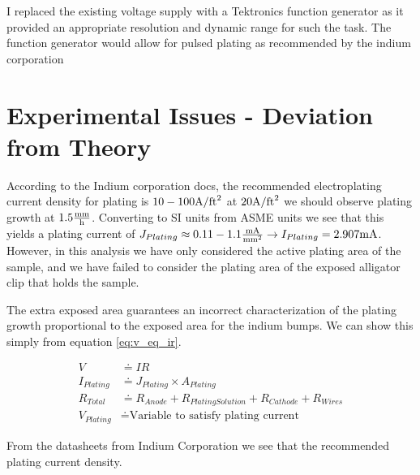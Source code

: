 I replaced the existing voltage supply with a Tektronics function generator as it provided an appropriate resolution and dynamic range for such the task.
The function generator would allow for pulsed plating as recommended by the indium corporation \cite{indiumCorpGrainStructure}

\newpage
\section{Experimental Issues - Deviation from Theory}

According to the Indium corporation docs, the recommended electroplating current density for plating is $10-100 \jufeet$ at $20 \jufeet$ we should observe plating growth at $1.5 \mmph$.
Converting to SI units from ASME units we see that this yields a plating current of $ J_{Plating} \approx 0.11-1.1 \junits \rightarrow I_{Plating} = 2.907 \mA$. However, in this analysis we have only considered the active plating area of the sample, and we have failed to consider the plating area of the exposed alligator clip that holds the sample.

The extra exposed area guarantees an incorrect characterization of the plating growth proportional to the exposed area for the indium bumps. We can show this simply from equation \ref{eq:v_eq_ir}.

\begin{equation}
    \begin{split}
        V &\doteq I R \\
        I_{Plating} &\doteq J_{Plating} \times A_{Plating} \\
        R_{Total} &\doteq R_{Anode} + R_{Plating Solution} + R_{Cathode} + R_{Wires} \\
        V_{Plating} &\doteq \text{Variable to satisfy plating current}
    \end{split}
    \label{eq:v_eq_ir}
\end{equation}

From the datasheets from Indium Corporation \cite{indiumCorpPlating} we see that the recommended plating current density.

